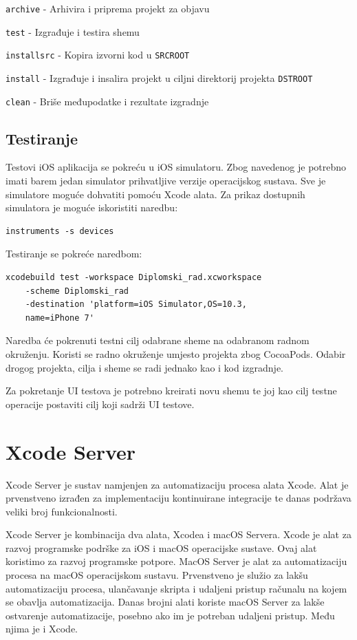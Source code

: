 \documentclass[times, utf8, diplomski, numeric]{fer}
\begin{document}
\begin{appendices}
\verb|archive| - Arhivira i priprema projekt za objavu

\verb|test| - Izgrađuje i testira shemu

\verb|installsrc| - Kopira izvorni kod u \verb|SRCROOT|

\verb|install| - Izgrađuje i insalira projekt u ciljni direktorij projekta \verb|DSTROOT|

\verb|clean| - Briše međupodatke i rezultate izgradnje

\section{Testiranje}

Testovi iOS aplikacija se pokreću u iOS simulatoru. Zbog navedenog je potrebno imati barem jedan simulator prihvatljive verzije operacijskog sustava. Sve je simulatore moguće dohvatiti pomoću Xcode alata. Za prikaz dostupnih simulatora je moguće iskoristiti naredbu:
\begin{verbatim}
instruments -s devices
\end{verbatim}

Testiranje se pokreće naredbom:
\begin{verbatim}
xcodebuild test -workspace Diplomski_rad.xcworkspace
    -scheme Diplomski_rad
    -destination 'platform=iOS Simulator,OS=10.3,
    name=iPhone 7'
\end{verbatim}

Naredba će pokrenuti testni cilj odabrane sheme na odabranom radnom okruženju. Koristi se radno okruženje umjesto projekta zbog CocoaPods. Odabir drogog projekta, cilja i sheme se radi jednako kao i kod izgradnje.

Za pokretanje UI testova je potrebno kreirati novu shemu te joj kao cilj testne operacije postaviti cilj koji sadrži UI testove.

\chapter{Xcode Server}

Xcode Server je sustav namjenjen za automatizaciju procesa alata Xcode. Alat je prvenstveno izrađen za implementaciju kontinuirane integracije te danas podržava veliki broj funkcionalnosti.

Xcode Server je kombinacija dva alata, Xcodea i macOS Servera. Xcode je alat za razvoj programske podrške za iOS i macOS operacijske sustave. Ovaj alat koristimo za razvoj programske potpore. MacOS Server je alat za automatizaciju procesa na macOS operacijskom sustavu. Prvenstveno je služio za lakšu automatizaciju procesa, ulančavanje skripta i udaljeni pristup računalu na kojem se obavlja automatizacija. Danas brojni alati koriste macOS Server za lakše ostvarenje automatizacije, posebno ako im je potreban udaljeni pristup. Među njima je i Xcode.


\end{appendices}
\end{document}
